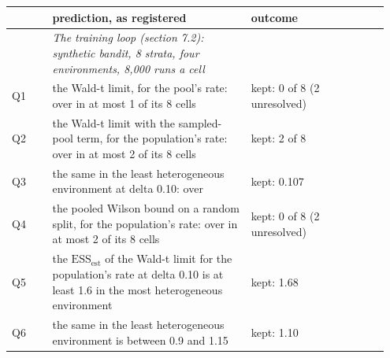 \documentclass[11pt]{article}
\begin{document}
\begingroup\footnotesize\setlength{\tabcolsep}{4pt}
\begin{longtable}{@{}>{\raggedright\arraybackslash}p{0.101\linewidth}>{\raggedright\arraybackslash}p{0.499\linewidth}>{\raggedright\arraybackslash}p{0.346\linewidth}@{}}
\toprule
 & \textbf{\hspace{0pt}prediction, as registered} & \textbf{\hspace{0pt}outcome} \\
\midrule
\endhead
\bottomrule
\endlastfoot
 & \hspace{0pt}\emph{The training loop (section 7.2): synthetic bandit, 8 strata, four environments, 8,000 runs a cell} &  \\
\hspace{0pt}Q1 & \hspace{0pt}the Wald-t limit, for the pool's rate: over in at most 1 of its 8 cells & \hspace{0pt}kept: 0 of 8 (2 unresolved) \\
\hspace{0pt}Q2 & \hspace{0pt}the Wald-t limit with the sampled-pool term, for the population's rate: over in at most 2 of its 8 cells & \hspace{0pt}kept: 2 of 8 \\
\hspace{0pt}Q3 & \hspace{0pt}the same in the least heterogeneous environment at delta 0.10: over & \hspace{0pt}kept: 0.107 \\
\hspace{0pt}Q4 & \hspace{0pt}the pooled Wilson bound on a random split, for the population's rate: over in at most 2 of its 8 cells & \hspace{0pt}kept: 0 of 8 (2 unresolved) \\
\hspace{0pt}Q5 & \hspace{0pt}the $\mathrm{ESS}_{\mathrm{est}}$ of the Wald-t limit for the population's rate at delta 0.10 is at least 1.6 in the most heterogeneous environment & \hspace{0pt}kept: 1.68 \\
\hspace{0pt}Q6 & \hspace{0pt}the same in the least heterogeneous environment is between 0.9 and 1.15 & \hspace{0pt}kept: 1.10 \\

\end{longtable}
\end{document}
